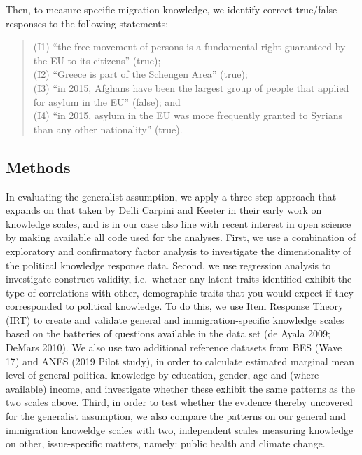 \documentclass[12pt,halfline,a4paper,]{ouparticle}
\begin{document}
Then, to measure specific migration knowledge, we identify correct
true/false responses to the following statements:

\begin{quote}
(I1) ``the free movement of persons is a fundamental right guaranteed by
the EU to its citizens'' (true);\\
(I2) ``Greece is part of the Schengen Area'' (true);\\
(I3) ``in 2015, Afghans have been the largest group of people that
applied for asylum in the EU'' (false); and\\
(I4) ``in 2015, asylum in the EU was more frequently granted to Syrians
than any other nationality'' (true).
\end{quote}

\hypertarget{methods}{%
\subsection{Methods}\label{methods}}

In evaluating the generalist assumption, we apply a three-step approach
that expands on that taken by Delli Carpini and Keeter in their early
work on knowledge scales, and is in our case also line with recent
interest in open science by making available all code used for the
analyses. First, we use a combination of exploratory and confirmatory
factor analysis to investigate the dimensionality of the political
knowledge response data. Second, we use regression analysis to
investigate construct validity, i.e.~whether any latent traits
identified exhibit the type of correlations with other, demographic
traits that you would expect if they corresponded to political
knowledge. To do this, we use Item Response Theory (IRT) to create and
validate general and immigration-specific knowledge scales based on the
batteries of questions available in the data set (de Ayala 2009; DeMars
2010). We also use two additional reference datasets from BES (Wave 17)
and ANES (2019 Pilot study), in order to calculate estimated marginal
mean level of general political knowledge by education, gender, age and
(where available) income, and investigate whether these exhibit the same
patterns as the two scales above. Third, in order to test whether the
evidence thereby uncovered for the generalist assumption, we also
compare the patterns on our general and immigration knoweldge scales
with two, independent scales measuring knowledge on other,
issue-specific matters, namely: public health and climate change.
\end{document}
